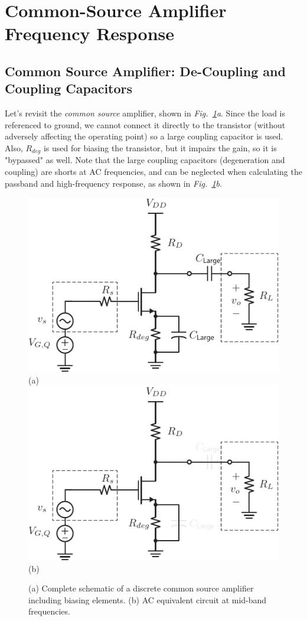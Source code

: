 \section{Common-Source Amplifier Frequency Response}
\subsection{Common Source Amplifier: De-Coupling and Coupling Capacitors}
Let's revisit the \textit{common source} amplifier, shown in \emph{Fig.~\ref{fig:cs_amp_acdc_RC_degen_capsshorted}a}.  Since the load is referenced to ground, we cannot connect it directly to the transistor (without adversely affecting the operating point) so a large coupling capacitor is used.  Also, $R_{deg}$ is used for biasing the transistor, but it impairs the gain, so it is "bypassed" as well.  Note that the large coupling capacitors (degeneration and coupling) are shorts at AC frequencies, and can be neglected when calculating the passband and high-frequency response, as shown in \emph{Fig.~\ref{fig:cs_amp_acdc_RC_degen_capsshorted}b}.
\vspace{0.5cm}
\begin{figure}[H]
\centering
\includegraphics[width=.65\columnwidth]{cs_amp_acdc_RC_degen}\\
(a)\\[1cm]
\includegraphics[width=.65\columnwidth]{cs_amp_acdc_RC_degen_capsshorted}\\
(b)\\
\caption{(a) Complete schematic of a discrete common source amplifier including biasing elements.  (b) AC equivalent circuit at mid-band frequencies.}
\label{fig:cs_amp_acdc_RC_degen_capsshorted}
\end{figure}
